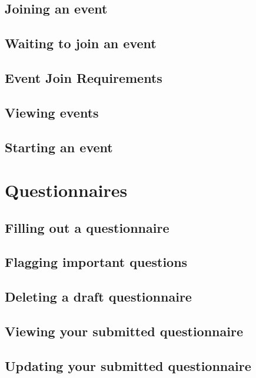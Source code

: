 \documentclass[a4paper,11pt,titlepage]{scrartcl}
\begin{document}
\subsection{Joining an event}

\subsection{Waiting to join an event}

\subsection{Event Join Requirements}

\subsection{Viewing events}

\subsection{Starting an event}

\clearpage
\section{Questionnaires}

\subsection{Filling out a questionnaire}

\subsection{Flagging important questions}

\subsection{Deleting a draft questionnaire}

\subsection{Viewing your submitted questionnaire}

\subsection{Updating your submitted questionnaire}
\end{document}
